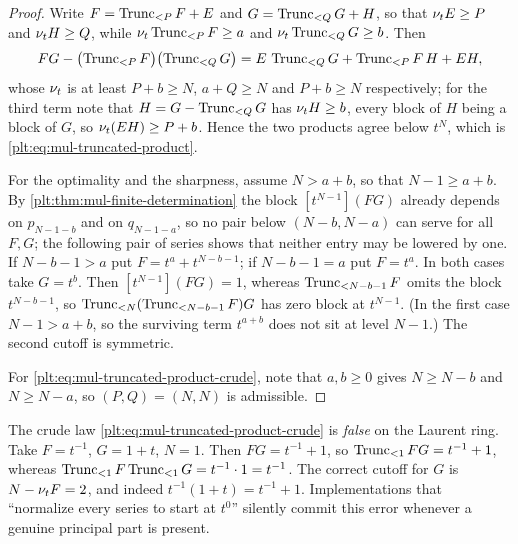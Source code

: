 \begin{proof}
Write $F=\Trunc{F}{P}+E$ and $G=\Trunc{G}{Q}+H$, so that $\ordt E\ge P$ and
$\ordt H\ge Q$, while $\ordt\Trunc{F}{P}\ge a$ and $\ordt\Trunc{G}{Q}\ge b$.
Then
\[
 FG-\bigl(\Trunc{F}{P}\bigr)\bigl(\Trunc{G}{Q}\bigr)
 =E\,\Trunc{G}{Q}+\Trunc{F}{P}\,H+EH,
\]
whose $\ordt$ is at least $P+b\ge N$, $a+Q\ge N$ and $P+b\ge N$
respectively; for the third term note that $H=G-\Trunc{G}{Q}$ has
$\ordt H\ge b$, every block of $H$ being a block of $G$, so
$\ordt(EH)\ge P+b$.  Hence the two products agree below $t^N$, which is
\eqref{plt:eq:mul-truncated-product}.

For the optimality and the sharpness, assume $N>a+b$, so that $N-1\ge a+b$.
By \cref{plt:thm:mul-finite-determination} the block $[t^{N-1}](FG)$ already
depends on $p_{N-1-b}$ and on $q_{N-1-a}$, so no pair below $(N-b,N-a)$ can
serve for all $F,G$; the following pair of series shows that neither entry
may be lowered by one.  If $N-b-1>a$ put $F=t^a+t^{N-b-1}$; if
$N-b-1=a$ put $F=t^a$.  In both cases take $G=t^b$.  Then
$[t^{N-1}](FG)=1$, whereas $\Trunc{F}{N-b-1}$ omits the block $t^{N-b-1}$,
so $\Trunc{(\Trunc{F}{N-b-1})G}{N}$ has zero block at $t^{N-1}$.  (In the
first case $N-1>a+b$, so the surviving term $t^{a+b}$ does not sit at
level $N-1$.)  The second cutoff is symmetric.

For \eqref{plt:eq:mul-truncated-product-crude}, note that $a,b\ge0$ gives
$N\ge N-b$ and $N\ge N-a$, so $(P,Q)=(N,N)$ is admissible.
\end{proof}

\begin{warningbox}
The crude law \eqref{plt:eq:mul-truncated-product-crude} is \emph{false} on
the Laurent ring.  Take $F=t^{-1}$, $G=1+t$, $N=1$.  Then $FG=t^{-1}+1$, so
$\Trunc{FG}{1}=t^{-1}+1$, whereas
$\Trunc{F}{1}\Trunc{G}{1}=t^{-1}\cdot1=t^{-1}$.  The correct cutoff for $G$
is $N-\ordt F=2$, and indeed $t^{-1}(1+t)=t^{-1}+1$.  Implementations that
``normalize every series to start at $t^0$'' silently commit this error
whenever a genuine principal part is present.
\end{warningbox}


